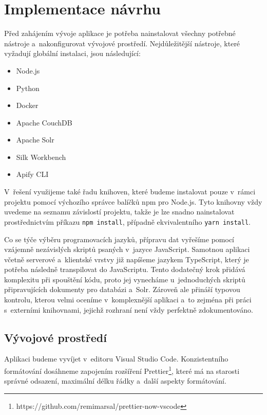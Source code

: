 
\chapter{Implementace návrhu}

Před zahájením vývoje aplikace je potřeba nainstalovat všechny potřebné nástroje a~nakonfigurovat vývojové prostředí. Nejdůležitější nástroje, které vyžadují globální instalaci, jsou následující:

\begin{itemize}
    \item Node.js
    \item Python
    \item Docker
    \item Apache CouchDB
    \item Apache Solr
    \item Silk Workbench
    \item Apify CLI
\end{itemize}

V~řešení využijeme také řadu knihoven, které budeme instalovat pouze v~rámci projektu pomocí výchozího správce balíčků npm pro Node.js. Tyto knihovny vždy uvedeme na seznamu závislostí projektu, takže je lze snadno nainstalovat prostřednictvím příkazu \texttt{npm\,install}, případně ekvivalentního \texttt{yarn\,install}.

Co se týče výběru programovacích jazyků, přípravu dat vyřešíme pomocí vzájemně nezávislých skriptů psaných v~jazyce JavaScript. Samotnou aplikaci včetně serverové a~klientské vrstvy již napíšeme jazykem TypeScript, který je potřeba následně transpilovat do JavaScriptu. Tento dodatečný krok přidává komplexitu při spouštění kódu, proto jej vynecháme u~jednoduchých skriptů připravujících dokumenty pro databázi a~Solr. Zároveň ale přináší typovou kontrolu, kterou velmi oceníme v~komplexnější aplikaci a~to zejména při práci s~externími knihovnami, jejichž rozhraní není vždy perfektně zdokumentováno.

\section{Vývojové prostředí}

Aplikaci budeme vyvíjet v~editoru Visual Studio Code. Konzistentního formátování dosáhneme zapojením rozšíření Prettier\footnote{https://github.com/remimarsal/prettier-now-vscode}, které má na starosti správné odsazení, maximální délku řádky a~další aspekty formátování.


